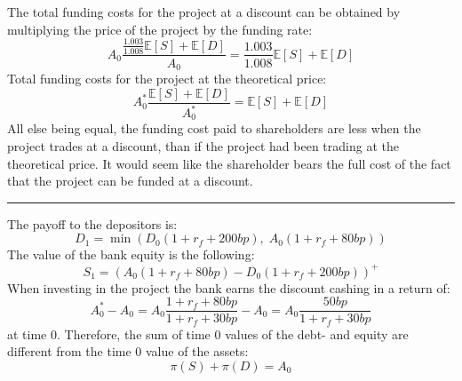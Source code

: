 \documentclass[10pt,a4paper]{article}
\begin{document}
        The total funding costs for the project at a discount can be obtained by multiplying the price of the project by the funding rate:
            \begin{equation}
                A_{0}
                \frac{
                    \frac{1.003}{1.008}\mathbb{E}\left[S\right]
                    + \mathbb{E}\left[D\right]
                }{
                    A_{0}
                }
                = \frac{1.003}{1.008}\mathbb{E}\left[S\right]
                + \mathbb{E}\left[D\right]
            \end{equation}
        Total funding costs for the project at the theoretical price:
            \begin{equation}
                A_{0}^{\ast} 
                \frac{
                \mathbb{E}\left[S\right] + \mathbb{E}\left[D\right]
                }{
                    A_{0}^{\ast}  
                } 
                = \mathbb{E}\left[S\right] 
                    + \mathbb{E}\left[D\right]
            \end{equation}
        All else being equal, the funding cost paid to shareholders are less when the project trades at a discount, than if the project had been trading at the theoretical price. It would seem like the shareholder bears the full cost of the fact that the project can be funded at a discount. 
        \newpage
        \rule{\textwidth}{1px}

        The payoff to the depositors is:
            \begin{equation}
                D_{1} = \min\left(
                    D_{0}(1 + r_{f} + 200bp), \;
                    A_{0}(1 + r_{f} + 80bp)
                \right)
            \end{equation}
        The value of the bank equity is the following:
            \begin{equation}
                S_{1} = \left(
                    A_{0}(1 + r_{f} + 80bp) - D_{0}(1+r_{f} + 200bp)
                \right)^{+}
            \end{equation}
        When investing in the project the bank earns the discount cashing in a return of: 
        \begin{equation}
            A_{0}^{\ast} - A_{0} = A_{0}\frac{1+r_{f} + 80bp}{1+r_{f} + 30bp} - A_{0} = A_{0}\frac{50bp}{1+r_{f}+30bp}
        \end{equation}
        at time $0$. Therefore, the sum of time $0$ values of the debt- and equity are different from the time $0$ value of the assets:
            \begin{equation}
                \pi(S) + \pi(D) = A_{0}
            \end{equation}
\end{document}
